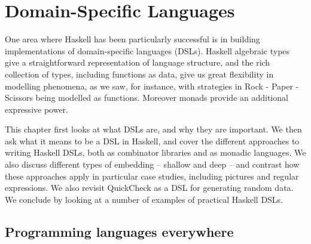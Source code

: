 \chapter{Domain-Specific Languages}
\chapstart
\label{dsls}

One area where Haskell has been particularly successful is in building implementations of domain-specific languages (DSLs). Haskell algebraic types give a straightforward representation of language structure, and the rich collection of types, including functions as data, give us great flexibility in modelling phenomena, as we saw, for instance, with strategies in Rock - Paper - Scissors being modelled as functions. Moreover monads provide an additional expressive power.

This chapter first looks at what DSLs are, and why they are important. We then ask what it means to be a DSL in Haskell, and cover the different approaches to writing Haskell DSLs, both as combinator libraries and as monadic languages. We also discuss different types of embedding -- shallow and deep -- and contrast how these approaches apply in particular case studies, including pictures and regular expressions. We also revisit QuickCheck as a DSL for generating random data. We conclude by looking at a number of examples of practical Haskell DSLs.

\section{Programming languages everywhere}

